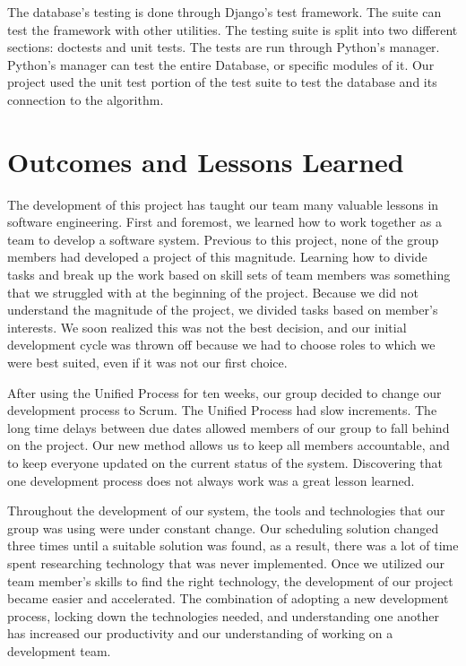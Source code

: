 \documentclass[12pt]{article}
\begin{document}
The database's testing is done through Django's test framework. The suite can test the framework with other utilities. The testing suite is split into two different sections: doctests and unit tests. The tests are run through Python's manager. Python's manager can test the entire Database, or specific modules of it. Our project used the unit test portion of the test suite to test the database and its connection to the algorithm.

\section{Outcomes and Lessons Learned} %
The development of this project has taught our team many valuable lessons in software engineering. First and foremost, we learned how to work together as a team to develop a software system. Previous to this project, none of the group members had developed a project of this magnitude. Learning how to divide tasks and break up the work based on skill sets of team members was something that we struggled with at the beginning of the project. Because we did not understand the magnitude of the project, we divided tasks based on member's interests. We soon realized this was not the best decision, and our initial development cycle was thrown off because we had to choose roles to which we were best suited, even if it was not our first choice.

After using the Unified Process for ten weeks, our group decided to change our development process to Scrum. The Unified Process had slow increments. The long time delays between due dates allowed members of our group to fall behind on the project. Our new method allows us to keep all members accountable, and to keep everyone updated on the current status of the system. Discovering that one development process does not always work was a great lesson learned.

Throughout the development of our system, the tools and technologies that our group was using were under constant change. Our scheduling solution changed three times until a suitable solution was found, as a result, there was a lot of time spent researching technology that was never implemented. Once we  utilized our team member's skills to find the right technology, the development of our project became easier and accelerated. The combination of adopting a new development process, locking down the technologies needed, and understanding one another has increased our productivity and our understanding of working on a development team. 
\end{document}
